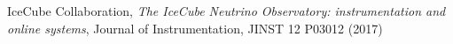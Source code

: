 \begin{thebibliography}{99}
 IceCube Collaboration, \textit{The IceCube Neutrino Observatory: instrumentation and online systems}, Journal of Instrumentation, JINST 12 P03012 (2017)
\end{thebibliography}